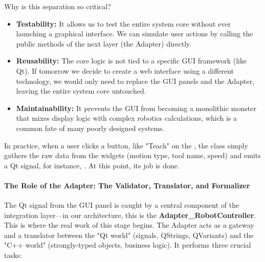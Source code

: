 Why is this separation so critical?
\begin{itemize}
    \item \textbf{Testability:} It allows us to test the entire system core without ever launching a graphical interface. We can simulate user actions by calling the public methods of the next layer (the Adapter) directly.
    \item \textbf{Reusability:} The core logic is not tied to a specific GUI framework (like Qt). If tomorrow we decide to create a web interface using a different technology, we would only need to replace the GUI panels and the Adapter, leaving the entire system core untouched.
    \item \textbf{Maintainability:} It prevents the GUI from becoming a monolithic monster that mixes display logic with complex robotics calculations, which is a common fate of many poorly designed systems.
\end{itemize}

In practice, when a user clicks a button, like "Teach" on the , the class simply gathers the raw data from the widgets (motion type, tool name, speed) and emits a Qt signal, for instance, . At this point, its job is done.

\paragraph{The Role of the Adapter: The Validator, Translator, and Formalizer}
The Qt signal from the GUI panel is caught by a central component of the integration layer—in our architecture, this is the \textbf{Adapter\_RobotController}. This is where the real work of this stage begins. The Adapter acts as a gateway and a translator between the "Qt world" (signals, QStrings, QVariants) and the "C++ world" (strongly-typed objects, business logic). It performs three crucial tasks:

